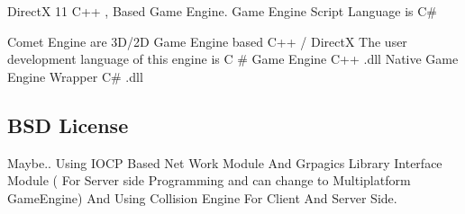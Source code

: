 DirectX 11 C++ , Based Game Engine. Game Engine Script Language is C\#

Comet Engine are 3\+D/2D Game Engine based C++ / DirectX The user development language of this engine is C \# Game Engine C++ .dll Native Game Engine Wrapper C\# .dll

\subsection*{B\+SD License}

Maybe..  Using I\+O\+CP Based Net Work Module  And Grpagics Library Interface Module ( For Server side Programming and can change to Multiplatform Game\+Engine) And Using Collision Engine For Client And Server Side. 